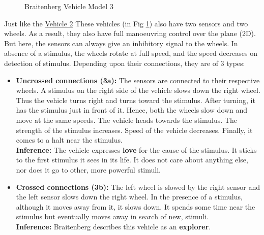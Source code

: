     \begin{figure}[b]%
        \centering
        \qquad
        \caption{Braitenberg Vehicle Model 3}%
        \label{fig:vehicle3}%
    \end{figure}

    Just like the \hyperref[sec:Vehicle_2]{Vehicle 2} These vehicles (in Fig \ref{fig:vehicle3}) also have two sensors and two wheels. As a result, they also have full manoeuvring control over the plane (2D). But here, the sensors can always give an inhibitory signal to the wheels. In absence of a stimulus, the wheels rotate at full speed, and the speed decreases on detection of stimulus. Depending upon their connections, they are of 3 types:

    \begin{itemize}
        \item \textbf{Uncrossed connections (3a):} The sensors are connected to their respective wheels. A stimulus on the right side of the vehicle slows down the right wheel. Thus the vehicle turns right and turns toward the stimulus. After turning, it has the stimulus just in front of it. Hence, both the wheels slow down and move at the same speeds. The vehicle heads towards the stimulus. The strength of the stimulus increases. Speed of the vehicle decreases. Finally, it comes to a halt near the stimulus.\\
        \textbf{Inference:} The vehicle expresses \textbf{love} for the cause of the stimulus. It sticks to the first stimulus it sees in its life. It does not care about anything else, nor does it go to other, more powerful stimuli.
        \item \textbf{Crossed connections (3b):} The left wheel is slowed by the right sensor and the left sensor slows down the right wheel. In the presence of a stimulus, although it moves away from it, it slows down. It spends some time near the stimulus but eventually moves away in search of new, stimuli.\\
        \textbf{Inference:} Braitenberg describes this vehicle as an \textbf{explorer}.
    \end{itemize}

